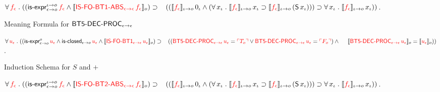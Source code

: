 \documentclass[fleqn]{llncs}
\begin{document}
\begin{biformthy}
    $\forall\, \textcolor{red}{f_\epsilon} \mathrel. 
    ((\mbox{\sf is-expr}_{\epsilon \rightarrow o}^{\iota \rightarrow o} \, \textcolor{red}{f_\epsilon} \wedge
    \llbracket\textcolor{red}{\mbox{\sf IS-FO-BT1-ABS}_{\epsilon \rightarrow \epsilon} \, 
    f_\epsilon}\rrbracket_o) \supset {} \\
    \hspace*{2ex}((\llbracket\textcolor{red}{f_\epsilon}\rrbracket_{\iota \rightarrow o} \, 0_\iota \wedge
    (\forall\, x_\iota \mathrel. 
    \llbracket\textcolor{red}{f_\epsilon}\rrbracket_{\iota \rightarrow o} \, x_\iota \supset
    \llbracket\textcolor{red}{f_\epsilon}\rrbracket_{\iota \rightarrow o} \, 
    (\mbox{\sf S} \, x_\iota))) \supset 
    \forall\, x_\iota \mathrel. 
    \llbracket\textcolor{red}{f_\epsilon}\rrbracket_{\iota \rightarrow o} \, x_\iota))$.

    \item Meaning Formula for $\mbox{\sf BT5-DEC-PROC}_{\epsilon \rightarrow \epsilon}$

    $\forall\, \textcolor{red}{u_\epsilon} \mathrel. 
    ((\mbox{\sf is-expr}_{\epsilon \rightarrow o}^{o} \, 
    \textcolor{red}{u_\epsilon} \wedge
    \mbox{\sf is-closed}_{\epsilon \rightarrow o} \, \textcolor{red}{u_\epsilon} \wedge 
    \llbracket\textcolor{red}{\mbox{\sf IS-FO-BT1}_{\epsilon \rightarrow \epsilon} \, 
    u_\epsilon}\rrbracket_o) \supset {}\\
    \hspace*{2ex}((\textcolor{red}{\mbox{\sf BT5-DEC-PROC}_{\epsilon \rightarrow \epsilon} \, u_\epsilon} = 
    \textcolor{red}{\ulcorner T_o\urcorner} \vee 
    \textcolor{red}{\mbox{\sf BT5-DEC-PROC}_{\epsilon \rightarrow \epsilon} \, u_\epsilon} = 
    \textcolor{red}{\ulcorner F_o\urcorner}) \wedge {}\\
    \hspace*{3.1ex}
    \llbracket\textcolor{red}{\mbox{\sf BT5-DEC-PROC}_{\epsilon \rightarrow \epsilon} \, u_\epsilon}\rrbracket_o =
    \llbracket\textcolor{red}{u_\epsilon}\rrbracket_o))$.
    \fi

    \setcounter{enumi}{28}

    \item Induction Schema for $S$ and $+$

    $\forall\, \textcolor{red}{f_\epsilon} \mathrel. 
    ((\mbox{\sf is-expr}_{\epsilon \rightarrow o}^{\iota \rightarrow o} \, \textcolor{red}{f_\epsilon} \wedge
    \llbracket\textcolor{red}{\mbox{\sf IS-FO-BT2-ABS}_{\epsilon \rightarrow \epsilon} \, 
    f_\epsilon}\rrbracket_o) \supset {} \\
    \hspace*{2ex}((\llbracket\textcolor{red}{f_\epsilon}\rrbracket_{\iota \rightarrow o} \, 0_\iota \wedge
    (\forall\, x_\iota \mathrel. 
    \llbracket\textcolor{red}{f_\epsilon}\rrbracket_{\iota \rightarrow o} \, x_\iota \supset
    \llbracket\textcolor{red}{f_\epsilon}\rrbracket_{\iota \rightarrow o} \, 
    (\mbox{\sf S} \, x_\iota))) \supset 
    \forall\, x_\iota \mathrel. 
    \llbracket\textcolor{red}{f_\epsilon}\rrbracket_{\iota \rightarrow o} \, x_\iota))$.


\end{biformthy}
\end{document}
